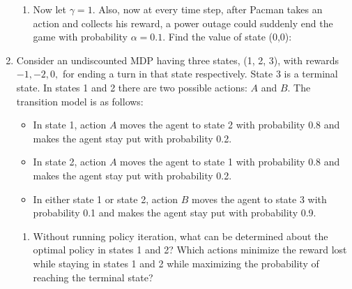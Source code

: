 \documentclass[11pt]{article}
\newif\ifsol
\begin{document}
\begin{enumerate}
\begin{enumerate}[label=\alph*)]
\item Now let $\gamma = 1$.
Also, now at every time step, after Pacman takes an action and collects his reward, a power outage could suddenly end the game with probability $\alpha = 0.1$. Find the value of state (0,0):

\ifsol
  \bigskip
  {\color{blue}
    Again we would like to stay in state (0,0) forever. However, there is a chance $\alpha$ that the game ends on each turn therefore we expect the game to go for $1/\alpha$ rounds where we get reward $1$. $V = 1/\alpha = 10$. \\
    
    Another approach to this problem would calculate the value by doing an infinite geometric sum $1 + (1 - \alpha) + (1 - \alpha^2) + ... = 10$, essentially treating the probability of ending the game as a discount.}
    \bigskip
\else
  \bigskip \bigskip
\fi

\end{enumerate}

\clearpage
\item Consider an undiscounted MDP having three states, (1, 2, 3), with rewards $-1, -2, 0,$ for ending a turn in that state respectively. State 3 is a terminal state. In states 1 and 2 there are two possible actions: $A$ and $B$. The transition model is as follows:
\begin{itemize}
  \item In state 1, action $A$ moves the agent to state 2 with probability 0.8 and makes the agent stay put with probability 0.2.
  \item  In state 2, action $A$ moves the agent to state 1 with probability 0.8 and makes the agent stay put with probability 0.2.
  \item In either state 1 or state 2, action $B$ moves the agent to state 3 with probability 0.1 and makes the agent stay put with probability 0.9.
\end{itemize}

\begin{enumerate}[label=\alph*)]
  \item Without running policy iteration, what can be determined about the optimal policy in states 1 and 2? Which actions minimize the reward lost while staying in states 1 and 2 while maximizing the probability of reaching the terminal state?

  \ifsol
    \bigskip
    {\color{blue} Intuitively, the agent wants to get to state 3 as soon as possible, because it will pay a cost for each time step it spends in states 1 and 2. However, the only action that reaches state 3 (action b) succeeds with low probability, so the agent should minimize the cost it incurs while trying to reach the terminal state. This suggests that the agent should definitely try action b in state 1; in state 2, it might be better to try action a to get to state 1 (which is the better place to wait for admission to state 3), rather than aiming directly for state 3. The decision in state 2 involves a numerical tradeoff.}
    \bigskip
  \else
    \bigskip \bigskip \bigskip \bigskip \bigskip \bigskip \bigskip
    \bigskip \bigskip \bigskip \bigskip \bigskip \bigskip \bigskip
  \fi


\end{enumerate}
\end{enumerate}
\end{document}

